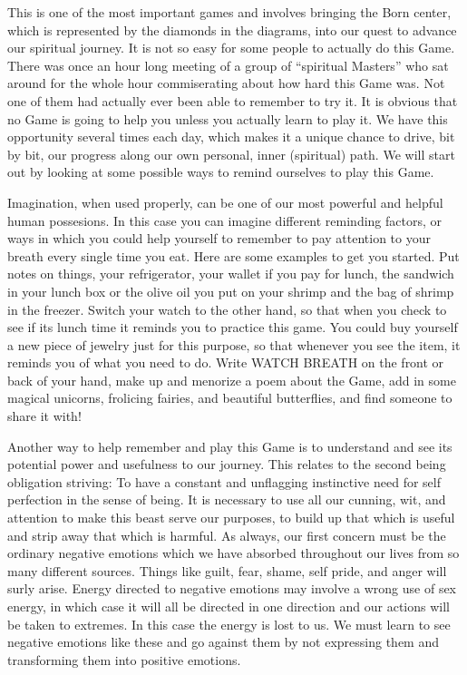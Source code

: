 \documentclass[12pt,letterpaper]{book}
\begin{document}
This is one of the most important games and involves bringing the Born center, which is represented by the diamonds in the diagrams, into our quest to advance our spiritual journey. It is not so easy for some people to actually do this Game. There was once an hour long meeting of a group of ``spiritual Masters'' who sat around for the whole hour commiserating about how hard this Game was. Not one of them had actually ever been able to remember to try it. It is obvious that no Game is going to help you unless you actually learn to play it. We have this opportunity several times each day, which makes it a unique chance to drive, bit by bit, our progress along our own personal, inner (spiritual) path. We will start out by looking at some possible ways to remind ourselves to play this Game.

Imagination, when used properly, can be one of our most powerful and helpful human possesions. In this case you can imagine different reminding factors, or ways in which you could help yourself to remember to pay attention to your breath every single time you eat. Here are some examples to get you started. Put notes on things, your refrigerator, your wallet if you pay for lunch, the sandwich in your lunch box or the olive oil you put on your shrimp and the bag of shrimp in the freezer. Switch your watch to the other hand, so that when you check to see if its lunch time it reminds you to practice this game. You could buy yourself a new piece of jewelry just for this purpose, so that whenever you see the item, it reminds you of what you need to do. Write WATCH BREATH on the front or back of your hand, make up and menorize a poem about the Game, add in some magical unicorns, frolicing fairies, and beautiful butterflies, and find someone to share it with!

Another way to help remember and play this Game is to understand and see its potential power and usefulness to our journey. This relates to the second being obligation striving: To have a constant and unflagging instinctive need for self perfection in the sense of being. It is necessary to use all our cunning, wit, and attention to make this beast serve our purposes, to build up that which is useful and strip away that which is harmful. As always, our first concern must be the ordinary negative emotions which we have absorbed throughout our lives from so many different sources. Things like guilt, fear, shame, self pride, and anger will surly arise. Energy directed to negative emotions may involve a wrong use of sex energy, in which case it will all be directed in one direction and our actions will be taken to extremes. In this case the energy is lost to us. We must learn to see negative emotions like these and go against them by not expressing them and transforming them into positive emotions.
\end{document}
